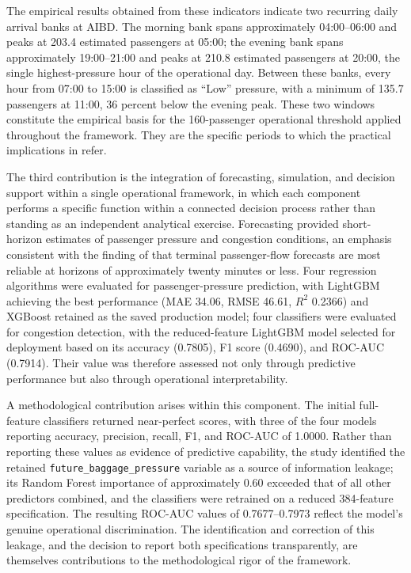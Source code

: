 The empirical results obtained from these indicators indicate two recurring daily arrival banks at AIBD. The morning bank spans approximately 04:00--06:00 and peaks at 203.4 estimated passengers at 05:00; the evening bank spans approximately 19:00--21:00 and peaks at 210.8 estimated passengers at 20:00, the single highest-pressure hour of the operational day. Between these banks, every hour from 07:00 to 15:00 is classified as ``Low'' pressure, with a minimum of 135.7 passengers at 11:00, 36 percent below the evening peak. These two windows constitute the empirical basis for the 160-passenger operational threshold applied throughout the framework. They are the specific periods to which the practical implications in  refer.

The third contribution is the integration of forecasting, simulation, and decision support within a single operational framework, in which each component performs a specific function within a connected decision process rather than standing as an independent analytical exercise. Forecasting provided short-horizon estimates of passenger pressure and congestion conditions, an emphasis consistent with the finding of \textcite{orsini2019neural} that terminal passenger-flow forecasts are most reliable at horizons of approximately twenty minutes or less. Four regression algorithms were evaluated for passenger-pressure prediction, with LightGBM achieving the best performance (MAE 34.06, RMSE 46.61, $R^2$ 0.2366) and XGBoost retained as the saved production model; four classifiers were evaluated for congestion detection, with the reduced-feature LightGBM model selected for deployment based on its accuracy (0.7805), F1 score (0.4690), and ROC-AUC (0.7914). Their value was therefore assessed not only through predictive performance but also through operational interpretability.

A methodological contribution arises within this component. The initial full-feature classifiers returned near-perfect scores, with three of the four models reporting accuracy, precision, recall, F1, and ROC-AUC of 1.0000. Rather than reporting these values as evidence of predictive capability, the study identified the retained \nolinkurl{future_baggage_pressure} variable as a source of information leakage; its Random Forest importance of approximately 0.60 exceeded that of all other predictors combined, and the classifiers were retrained on a reduced 384-feature specification. The resulting ROC-AUC values of 0.7677--0.7973 reflect the model’s genuine operational discrimination. The identification and correction of this leakage, and the decision to report both specifications transparently, are themselves contributions to the methodological rigor of the framework.

